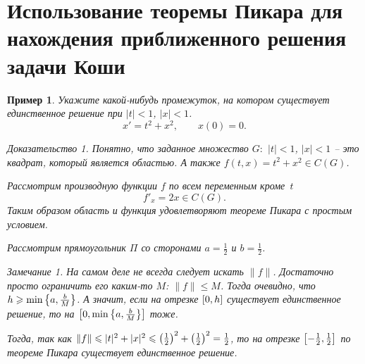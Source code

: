 \documentclass[a5paper, 11pt]{article}
\theoremstyle{definition}
\theoremstyle{plain}
\newtheorem{Ex}{Пример}
\theoremstyle{remark}
\newtheorem*{Note}{Замечание}
\newtheorem*{Proof}{Доказательство}
\begin{document}
	\section[25.11.2022]{Использование теоремы Пикара для нахождения приближенного решения задачи Коши}
	\begin{Ex}
		Укажите какой-нибудь промежуток, на котором существует единственное решение при $|t|<1$, $|x|<1$.
		\[
		x' = t^2+x^2, \qquad x(0) = 0.
		\]
		\begin{Proof}
			Понятно, что заданное множество $G:$ $|t|<1$, $|x|<1$ -- это квадрат, который является областью. А также $f(t,x) = t^2+x^2 \in C(G)$. 
			
			Рассмотрим производную функции $f$ по всем переменным кроме~$t$
			\[
			f'_x = 2x \in C(G).
			\]
			Таким образом область и функция удовлетворяют теореме Пикара с простым условием.
			
			Рассмотрим прямоугольник $\Pi$ со сторонами $a=\frac12$ и $b=\frac12$. 
			\begin{Note}
				На самом деле не всегда следует искать $\|f\|$. Достаточно просто ограничить его каким-то $M$: $\|f\| \leqslant M$. Тогда очевидно, что $h\geqslant \min\left\{a,\frac{b}{M}\right\}$. А значит, если на отрезке $\left[0,h\right]$ существует единственное решение, то на $\left[0,\min\left\{a,\frac{b}{M}\right\}\right]$ тоже.
			\end{Note}
		
			Тогда, так как $\|f\| \leqslant |t|^2 + |x|^2 \leqslant \left(\frac12\right)^2 + \left(\frac12\right)^2 = \frac12$, то на отрезке $\left[-\frac12, \frac12\right]$ по теореме Пикара существует единственное решение.
		\end{Proof}
	\end{Ex}
\end{document}
